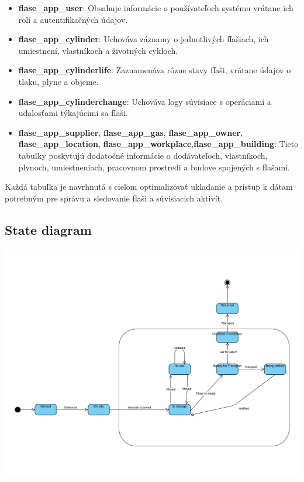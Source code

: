 \documentclass{zah}
\begin{document}
\begin{itemize}
    \item \textbf{flase\_app\_user}: Obsahuje informácie o používateľoch systému vrátane ich rolí a autentifikačných údajov.
    \item \textbf{flase\_app\_cylinder}: Uchováva záznamy o jednotlivých fľašiach, ich umiestnení, vlastníkoch a životných cykloch.
    \item \textbf{flase\_app\_cylinderlife}: Zaznamenáva rôzne stavy fľaši, vrátane údajov o tlaku, plyne a objeme.
    \item \textbf{flase\_app\_cylinderchange}: Uchováva logy súvisiace s operáciami a udalosťami týkajúcimi sa fľaši.
    \item \textbf{flase\_app\_supplier}, \textbf{flase\_app\_gas}, \textbf{flase\_app\_owner}, \textbf{flase\_app\_location}, \textbf{flase\_app\_workplace},\textbf{flase\_app\_building}: Tieto tabuľky poskytujú dodatočné informácie o dodávateľoch, vlastníkoch, plynoch, umiestneniach, pracovnom prostredi a budove spojených s fľašami.
\end{itemize}

Každá tabuľka je navrhnutá s cieľom optimalizovať ukladanie a prístup k dátam potrebným pre správu a sledovanie fľaši a súvisiacich aktivít.

\subsection{State diagram}
\includegraphics[width=\textwidth]{navrh-assets/state}
\end{document}
